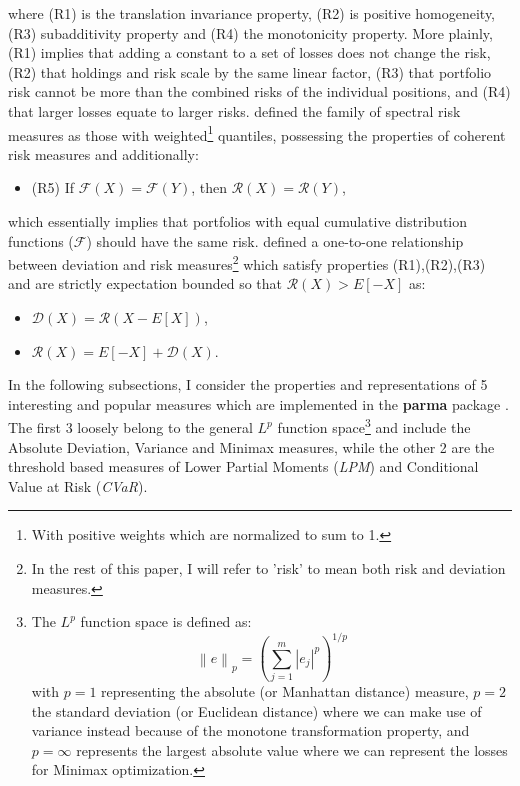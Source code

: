 where (R1) is the translation invariance property, (R2) is positive
homogeneity, (R3) subadditivity property and (R4) the monotonicity property.
More plainly, (R1) implies that adding a constant to a set of losses does not
change the risk, (R2) that holdings and risk scale by the same linear factor,
(R3) that portfolio risk cannot be more than the combined risks of the
individual positions, and (R4) that larger losses equate to larger risks.
 defined the family of spectral risk measures as
those with weighted\footnote{With positive weights which are normalized to sum to 1.}
quantiles, possessing the properties of coherent risk measures and additionally:
\begin{itemize}
\item (R5) If $\mathcal{F}\left( X \right)=\mathcal{F}\left( Y \right)$, then $\mathcal{R}\left( X \right)=\mathcal{R}\left( Y \right)$,
\end{itemize}
which essentially implies that portfolios with equal cumulative distribution
functions ($\mathcal{F}$) should have the same risk.
 defined a one-to-one relationship between
deviation and risk measures\footnote{In the rest of this paper, I will refer
to 'risk' to mean both risk and deviation measures.} which satisfy properties
(R1),(R2),(R3) and are strictly expectation bounded so that
$\mathcal{R}(X)>E\left[-X\right]$ as:
\begin{itemize}
\item $\mathcal{D}\left( X \right)=\mathcal{R}\left( {X - E\left[ X \right]} \right)$,
\item $\mathcal{R}\left( X \right)=E\left[ { - X} \right] + \mathcal{D}\left( X \right)$.
\end{itemize}
In the following subsections, I consider the properties and representations
of 5 interesting and popular measures which are implemented in the
\textbf{parma} package . The first 3 loosely belong to the general $L^p$
function space\footnote{The $L^p$ function space is defined as:
\begin{equation}
{\left\| e \right\|_p}={\left( {\sum\limits_{j=1}^m {{{\left| {{e_j}} \right|}^p}} } \right)^{1/p}}
\end{equation}
with $p=1$ representing the absolute (or Manhattan distance) measure, $p=2$
the  standard deviation (or Euclidean distance) where we can make use of
variance instead because of the monotone transformation property, and
$p=\infty$ represents the largest absolute value where we can represent the
losses for Minimax optimization.} and include the Absolute Deviation,
Variance and Minimax measures, while the other 2 are the threshold based
measures of Lower Partial Moments (\emph{LPM}) and Conditional Value at Risk
(\emph{CVaR}).
